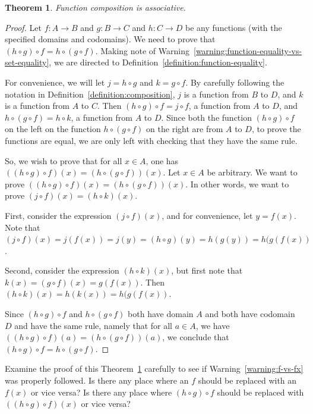 \documentclass{book}
\newcounter{ekcounter}%
\theoremstyle{ekimcustom}
\newtheorem{theorem}[ekcounter]{Theorem}
\begin{document}
\begin{theorem}\label{theorem:composition-associative}
Function composition is associative.
\end{theorem}
\begin{proof}
Let $f : A \to B$ and $g : B \to C$ and $h : C \to D$ be any functions (with the specified domains and codomains). We need to prove that $(h \circ g) \circ f = h \circ (g \circ f)$. Making note of Warning~\ref{warning:function-equality-vs-set-equality}, we are directed to Definition~\ref{definition:function-equality}.

For convenience, we will let $j = h \circ g$ and $k = g \circ f$. By carefully following the notation in Definition~\ref{definition:composition}, $j$ is a function from $B$ to $D$, and $k$ is a function from $A$ to $C$. Then $(h \circ g) \circ f = j \circ f$, a function from $A$ to $D$, and $h \circ (g \circ f) = h \circ k$, a function from $A$ to $D$. Since both the function $(h \circ g) \circ f$ on the left on the function $h \circ (g \circ f)$ on the right are from $A$ to $D$, to prove the functions are equal, we are only left with checking that they have the same rule.

So, we wish to prove that for all $x \in A$, one has $((h \circ g) \circ f)(x) = (h \circ (g \circ f))(x)$. Let $x \in A$ be arbitrary. We want to prove $((h \circ g) \circ f)(x) = (h \circ (g \circ f))(x)$. In other words, we want to prove $(j \circ f)(x) = (h \circ k)(x)$.

First, consider the expression $(j \circ f)(x)$, and for convenience, let $y=f(x)$. Note that $(j \circ f)(x) = j(f(x)) = j(y) = (h \circ g)(y) = h(g(y)) = h(g(f(x))$.

Second, consider the expression $(h \circ k)(x)$, but first note that $k(x)=(g \circ f)(x) = g(f(x))$. Then $(h \circ k)(x) = h(k(x)) = h(g(f(x))$.

Since $(h \circ g) \circ f$ and $h \circ (g \circ f)$ both have domain $A$ and both have codomain $D$ and have the same rule, namely that for all $a \in A$, we have $((h \circ g) \circ f)(a) = (h \circ (g \circ f))(a)$, we conclude that $(h \circ g) \circ f = h \circ (g \circ f)$.
\end{proof}
Examine the proof of this Theorem~\ref{theorem:composition-associative} carefully to see if Warning~\ref{warning:f-vs-fx} was properly followed. Is there any place where an $f$ should be replaced with an $f(x)$ or vice versa? Is there any place where $(h \circ g) \circ f$ should be replaced with $((h \circ g) \circ f)(x)$ or vice versa?
\end{document}
